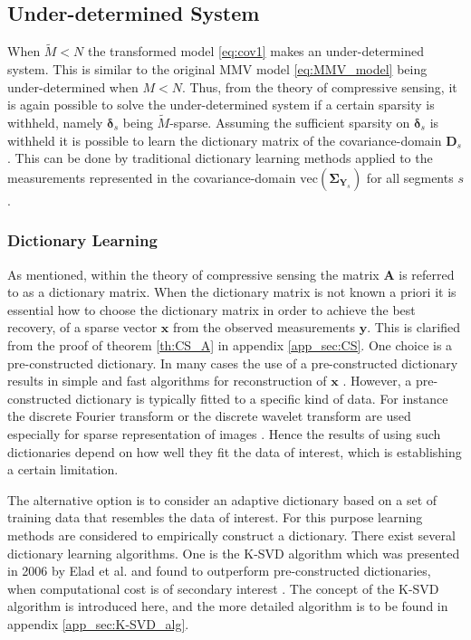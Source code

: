 \subsection{Under-determined System}\label{sec:cov1}
When $\widetilde{M} < N$ the transformed model \eqref{eq:cov1} makes an under-determined system. 
This is similar to the original MMV model \eqref{eq:MMV_model} being under-determined when $M < N$. 
Thus, from the theory of compressive sensing, it is again possible to solve the under-determined system if a certain sparsity is withheld, namely $\boldsymbol{\delta}_s$ being $\widetilde{M}$-sparse.
Assuming the sufficient sparsity on $\boldsymbol{\delta}_s$ is withheld it is possible to learn the dictionary matrix of the covariance-domain $\mathbf{D}_s$. 
This can be done by traditional dictionary learning methods applied to the measurements represented in the covariance-domain $\text{vec}\left(\widehat{\boldsymbol{\Sigma}}_{\mathbf{Y}_s}\right)$ for all segments $s$.

\subsubsection{Dictionary Learning}\label{sec:dictionarylearning}
As mentioned, within the theory of compressive sensing the matrix $\mathbf{A}$ is referred to as a dictionary matrix. 
When the dictionary matrix is not known a priori it is essential how to choose the dictionary matrix in order to achieve the best recovery, of a sparse vector $\mathbf{x}$ from the observed measurements $\mathbf{y}$. 
This is clarified from the proof of theorem \ref{th:CS_A} in appendix \ref{app_sec:CS}. 
One choice is a pre-constructed dictionary. 
In many cases the use of a pre-constructed dictionary results in simple and fast algorithms for reconstruction of $\mathbf{x}$ \cite{Elad_book}. 
However, a pre-constructed dictionary is typically fitted to a specific kind of data. 
For instance the discrete Fourier transform or the discrete wavelet transform are used especially for sparse representation of images \cite{Elad_book}. 
Hence the results of using such dictionaries depend on how well they fit the data of interest, which is establishing a certain limitation. 

The alternative option is to consider an adaptive dictionary based on a set of training data that resembles the data of interest. 
For this purpose learning methods are considered to empirically construct a dictionary. 
There exist several dictionary learning algorithms. One is the K-SVD algorithm which was presented in 2006 by Elad et al. and found to outperform pre-constructed dictionaries, when computational cost is of secondary interest \cite{Elad2006}. 
The concept of the K-SVD algorithm is introduced here, and the more detailed algorithm is to be found in appendix \ref{app_sec:K-SVD_alg}. 

